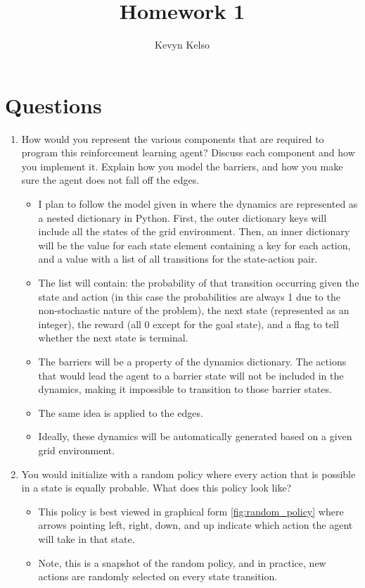 \documentclass[letterpaper]{article} %
\title{Homework 1}
\author{
    Kevyn Kelso
}
\begin{document}
\maketitle

\section{Questions}
\begin{enumerate}
    \item How would you represent the various components that are required to program this reinforcement learning agent? Discuss each component and how you implement it. Explain how you model the barriers, and how you make sure the agent does not fall off the edges.
	\begin{itemize}
	    \item I plan to follow the model given in \cite{Morales2020GrokkingDL} where the dynamics are represented as a nested dictionary in Python. First, the outer dictionary keys will include all the states of the grid environment. Then, an inner dictionary will be the value for each state element containing a key for each action, and a value with a list of all transitions for the state-action pair.
	    \item The list will contain: the probability of that transition occurring given the state and action (in this case the probabilities are always 1 due to the non-stochastic nature of the problem), the next state (represented as an integer), the reward (all 0 except for the goal state), and a flag to tell whether the next state is terminal.
	    \item The barriers will be a property of the dynamics dictionary. The actions that would lead the agent to a barrier state will not be included in the dynamics, making it impossible to transition to those barrier states.
	    \item The same idea is applied to the edges.
	    \item Ideally, these dynamics will be automatically generated based on a given grid environment.
	\end{itemize}
    \item You would initialize with a random policy where every action that is possible in a state is equally probable. What does this policy look like?
	\begin{itemize}
	    \item This policy is best viewed in graphical form \ref{fig:random_policy} where arrows pointing left, right, down, and up indicate which action the agent will take in that state.
	    \item Note, this is a snapshot of the random policy, and in practice, new actions are randomly selected on every state transition.
	\end{itemize}


\end{enumerate}
\end{document}
